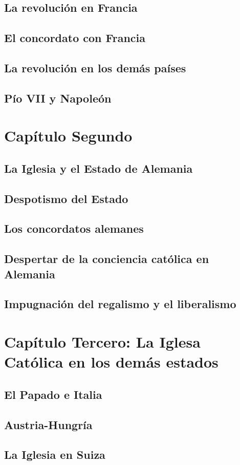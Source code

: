 \raggedbottom{} \documentclass[12pt, a4paper, openany]{book} %
\begin{document}
\section{La revolución en Francia}
\section{El concordato con Francia}
\section{La revolución en los demás países}
\section{Pío VII y Napoleón}
\chapter{Capítulo Segundo}
\section{La Iglesia y el Estado de Alemania}
\section{Despotismo del Estado}
\section{Los concordatos alemanes}
\section{Despertar de la conciencia católica en Alemania}
\section{Impugnación del regalismo y el liberalismo}
\chapter{Capítulo Tercero: La Iglesa Católica en los demás estados}
\section{El Papado e Italia}
\section{Austria-Hungría}
\section{La Iglesia en Suiza}
\end{document}

